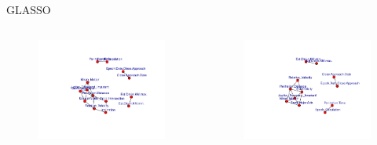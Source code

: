 \documentclass{beamer}
\begin{document}
\begin{frame}{GLASSO}
\begin{columns}
  \begin{figure}[b]{\textwidth}
    \centering
    \includegraphics[width=\textwidth]{Pic/GLASSO_0.3.pdf}
  \end{figure} 
  \begin{figure}[b]{\textwidth}
    \centering
    \includegraphics[width=\textwidth]{Pic/GLASSO_0.4.pdf}
  \end{figure}
\end{columns}
\end{frame}
\end{document}
